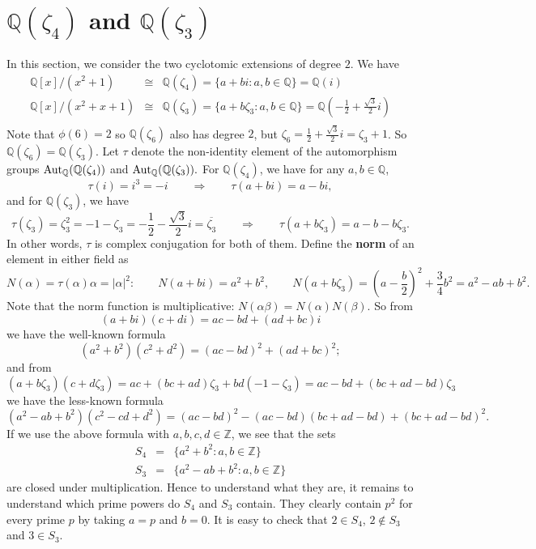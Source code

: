 \documentclass{article}
\def\Z{{\mathbb Z}}
\def\Aut{{\rm Aut}}
\def\Q{{\mathbb Q}}
\def\Z{{\mathbb Z}}
\def\Q{{\mathbb Q}}
\begin{document}
\section{$\Q(\zeta_4)$ and $\Q(\zeta_3)$}
In this section, we consider the two cyclotomic extensions of degree $2$. We have
\begin{eqnarray*}
    \Q[x]/(x^2 + 1) &\cong& \Q(\zeta_4) = \{a + bi\colon a,b\in\Q\} = \Q(i)\\
    \Q[x]/(x^2 + x + 1) &\cong& \Q(\zeta_3) = \{a + b\zeta_3\colon a,b\in\Q\} = \Q(-\frac12 + \frac{\sqrt{3}}{2}i)\\
\end{eqnarray*}
Note that $\phi(6) = 2$ so $\Q(\zeta_6)$ also has degree $2$, but $\zeta_6 = \frac12 + \frac{\sqrt{3}}{2}i = \zeta_3 + 1$. So $\Q(\zeta_6) = \Q(\zeta_3)$. Let $\tau$ denote the non-identity element of the automorphism groups $\Aut_\Q(\Q(\zeta_4))$ and $\Aut_\Q(\Q(\zeta_3)).$ For $\Q(\zeta_4)$, we have for any $a,b\in\Q$,
$$\tau(i) = i^3 = -i\qquad\Longrightarrow\qquad \tau(a + bi) = a - bi,$$
and for $\Q(\zeta_3)$, we have
$$\tau(\zeta_3) = \zeta_3^2 = -1 - \zeta_3 = -\frac12 - \frac{\sqrt{3}}{2}i = \overline{\zeta_3}\qquad\Longrightarrow\qquad \tau(a + b\zeta_3) = a - b - b\zeta_3.$$
In other words, $\tau$ is complex conjugation for both of them. Define the \textbf{norm} of an element in either field as
$$N(\alpha) = \tau(\alpha)\alpha = |\alpha|^2:\qquad N(a + bi) = a^2 + b^2,\qquad N(a + b\zeta_3) = (a - \frac{b}{2})^2 + \frac34b^2 = a^2 - ab + b^2.$$
Note that the norm function is multiplicative: $N(\alpha\beta) = N(\alpha)N(\beta)$. So from 
$$(a + bi)(c + di) = ac - bd + (ad + bc)i$$
we have the well-known formula
$$(a^2 + b^2)(c^2 + d^2) = (ac - bd)^2 + (ad + bc)^2;$$
and from 
$$(a + b\zeta_3)(c + d\zeta_3) = ac + (bc + ad)\zeta_3 + bd(-1-\zeta_3) = ac - bd + (bc + ad - bd)\zeta_3$$
we have the less-known formula
$$(a^2 - ab + b^2)(c^2 - cd + d^2) = (ac - bd)^2 - (ac - bd)(bc + ad - bd) + (bc + ad - bd)^2.$$
If we use the above formula with $a,b,c,d\in\Z$, we see that the sets
\begin{eqnarray*}
    S_4 &=& \{a^2 + b^2\colon a,b\in\Z\}\\
    S_3 &=& \{a^2 - ab + b^2\colon a,b\in\Z\}
\end{eqnarray*}
are closed under multiplication. Hence to understand what they are, it remains to understand which prime powers do $S_4$ and $S_3$ contain. They clearly contain $p^2$ for every prime $p$ by taking $a = p$ and $b = 0$. It is easy to check that $2\in S_4$, $2\notin S_3$ and $3\in S_3$.
\end{document}
